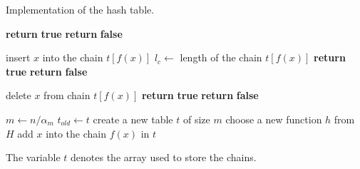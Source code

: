 \begin{algorithm}[ht]
\caption{Implementation of the hash table.}
\label{algorithm-hash-table}
\begin{minipage}[t]{0.5\linewidth}
\begin{algorithmic}
		\State \textbf{return} \textbf{true} 
	\Else
		\State \textbf{return} \textbf{false} 
	\EndIf
\EndProcedure
\end{algorithmic}
\vspace{0.1cm}
\begin{algorithmic}
		\State insert $x$ into the chain $t[f(x)]$
			\State {}
		\Else
			\State $l_c \leftarrow $ length of the chain $t[f(x)]$
				\State {}
			\EndIf
		\EndIf
		\State \textbf{return} \textbf{true} 
	\Else
		\State \textbf{return} \textbf{false} 
	\EndIf
\EndProcedure
\end{algorithmic}
\end{minipage}
\hfill
\begin{minipage}[t]{0.49\linewidth}
\begin{algorithmic}
		\State delete $x$ from chain $t[f(x)]$
			\State {}
		\EndIf
		\State \textbf{return} \textbf{true} 
	\Else
		\State \textbf{return} \textbf{false} 
	\EndIf
\EndProcedure
\end{algorithmic}
\vspace{0.1cm}
\begin{algorithmic}
	\State {}
		\State $m \leftarrow n / \alpha_m$
	\EndIf
	\State $t_{old} \leftarrow t$
	\Repeat
		\State create a new table $t$ of size $m$
		\State choose a new function $h$ from $H$
			\State add $x$ into the chain $f(x)$ in $t$
		\EndFor
\EndProcedure
\end{algorithmic}
\end{minipage}
\begin{minipage}[t]{\linewidth}
\vspace{0.3cm}
The variable $t$ denotes the array used to store the chains.
\end{minipage}
\end{algorithm}